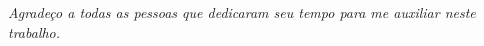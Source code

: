 \emph{
    Agradeço a todas as pessoas que dedicaram seu tempo para me auxiliar
    neste trabalho.
}